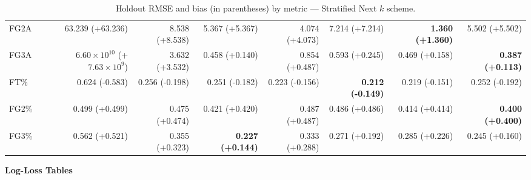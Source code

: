 \begin{table}[H]
{\begin{tabular}{lrrrrrrr}
FG2A & 63.239 (+63.236) & 8.538 (+8.538) & 5.367 (+5.367) & 4.074 (+4.073) & 7.214 (+7.214) & \textbf{1.360 (+1.360)} & 5.502 (+5.502) \\
FG3A & $6.60\times10^{10}$ (+$7.63\times10^{9}$) & 3.632 (+3.532) & 0.458 (+0.140) & 0.854 (+0.487) & 0.593 (+0.245) & 0.469 (+0.158) & \textbf{0.387 (+0.113)} \\
FT\% & 0.624 (-0.583) & 0.256 (-0.198) & 0.251 (-0.182) & 0.223 (-0.156) & \textbf{0.212 (-0.149)} & 0.219 (-0.151) & 0.252 (-0.192) \\
FG2\% & 0.499 (+0.499) & 0.475 (+0.474) & 0.421 (+0.420) & 0.487 (+0.487) & 0.486 (+0.486) & 0.414 (+0.414) & \textbf{0.400 (+0.400)} \\
FG3\% & 0.562 (+0.521) & 0.355 (+0.323) & \textbf{0.227 (+0.144)} & 0.333 (+0.288) & 0.271 (+0.192) & 0.285 (+0.226) & 0.245 (+0.160) \\
\bottomrule
\end{tabular}
}
\caption{Holdout RMSE and bias (in parentheses) by metric — Stratified Next $k$ scheme.}
\label{tab:coverage_stratified_next_k}
\end{table}

\bigskip
{\centering\large\textbf{Log-Loss Tables}\\[4pt]}

